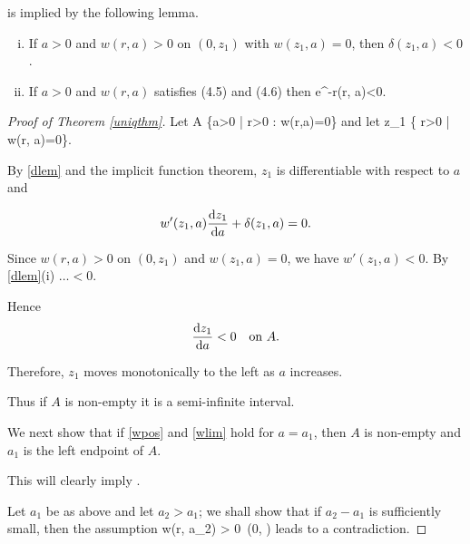  is implied by the following lemma.

\begin{lemma}
    \begin{enumerate}[(i)]
        \item If $a>0$ and $w(r, a)>0$ on $(0, z_1)$ with $w(z_1, a)=0$, then
            $\delta(z_1, a)<0$.
        \item If $a>0$ and $w(r, a)$ satisfies (4.5) and (4.6) then
            \be\label{dlim}
                 e^{-r}\delta(r, a)<0.
            \ee
    \end{enumerate}
\end{lemma}

\begin{proof}[Proof of Theorem \ref{uniqthm}]
    Let
    \be\label{adef}
    A \coloneqq \left\{\;a>0 \;\middle|\; \exists r>0 \;:\; w(r,a)=0\;\right\}
    \ee
    and let
    \be\label{z1def}
    z_1 \coloneqq \inf\left\{\; r>0 \;\middle|\; w(r, a)=0\;\right\}.
    \ee

    By \cref{dlem} and the implicit function theorem, $z_1$ is differentiable
    with respect to $a$ and

    $$w'(z_1, a)\frac{\mathop{}\!\mathrm{d} z_1}{\mathop{}\!\mathrm{d} a} + \delta(z_1, a) = 0.$$

    Since $w(r, a)>0$ on $(0, z_1)$ and $w(z_1, a)=0$, we have $w'(z_1, a)<0$. 
    By \cref{dlem}(i) $\ldots<0$. 

    Hence $$\dfrac{\mathop{}\!\mathrm{d} z_1}{\mathop{}\!\mathrm{d} a}<0\quad\text{on}~A.$$ 

    Therefore, $z_1$ moves monotonically to the left as $a$ increases. 

    Thus if $A$ is non-empty it is a semi-infinite interval. 
   
    We next show that if \eqref{wpos} and \eqref{wlim} hold for $a=a_1$, then $A$ is non-empty and
    $a_1$ is the left endpoint of $A$. 

    This will clearly imply .
   
    Let $a_1$ be as above and let $a_2>a_1$; we shall show that if $a_2-a_1$ is
    sufficiently small, then the assumption 
    \be\label{wass} w(r, a_2) > 0\quad{}~(0, \infty)\ee 
    leads to a contradiction. 


\end{proof}
